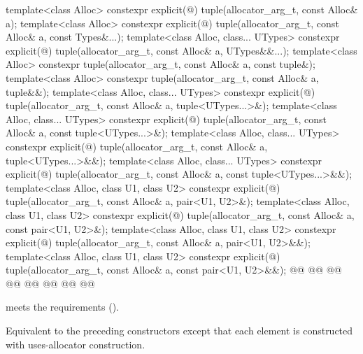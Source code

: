 \documentclass{wg21}
\begin{document}
%
\begin{itemdecl}
    template<class Alloc>
    constexpr explicit(@\seebelow@)
    tuple(allocator_arg_t, const Alloc& a);
    template<class Alloc>
    constexpr explicit(@\seebelow@)
    tuple(allocator_arg_t, const Alloc& a, const Types&...);
    template<class Alloc, class... UTypes>
    constexpr explicit(@\seebelow@)
    tuple(allocator_arg_t, const Alloc& a, UTypes&&...);
    template<class Alloc>
    constexpr tuple(allocator_arg_t, const Alloc& a, const tuple&);
    template<class Alloc>
    constexpr tuple(allocator_arg_t, const Alloc& a, tuple&&);
    template<class Alloc, class... UTypes>
    constexpr explicit(@\seebelow@)
    tuple(allocator_arg_t, const Alloc& a, tuple<UTypes...>&);
    template<class Alloc, class... UTypes>
    constexpr explicit(@\seebelow@)
    tuple(allocator_arg_t, const Alloc& a, const tuple<UTypes...>&);
    template<class Alloc, class... UTypes>
    constexpr explicit(@\seebelow@)
    tuple(allocator_arg_t, const Alloc& a, tuple<UTypes...>&&);
    template<class Alloc, class... UTypes>
    constexpr explicit(@\seebelow@)
    tuple(allocator_arg_t, const Alloc& a, const tuple<UTypes...>&&);
    template<class Alloc, class U1, class U2>
    constexpr explicit(@\seebelow@)
    tuple(allocator_arg_t, const Alloc& a, pair<U1, U2>&);
    template<class Alloc, class U1, class U2>
    constexpr explicit(@\seebelow@)
    tuple(allocator_arg_t, const Alloc& a, const pair<U1, U2>&);
    template<class Alloc, class U1, class U2>
    constexpr explicit(@\seebelow@)
    tuple(allocator_arg_t, const Alloc& a, pair<U1, U2>&&);
    template<class Alloc, class U1, class U2>
    constexpr explicit(@\seebelow@)
    tuple(allocator_arg_t, const Alloc& a, const pair<U1, U2>&&);
    @@
    @@
    @@
    @@
    @@
    @@
    @@
    @@
\end{itemdecl}

\begin{itemdescr}
    \pnum
    \expects
     meets the
     requirements ().
    
    \pnum
    \effects
    Equivalent to the preceding constructors except that each element is constructed with
    uses-allocator construction.
\end{itemdescr}
\end{document}
